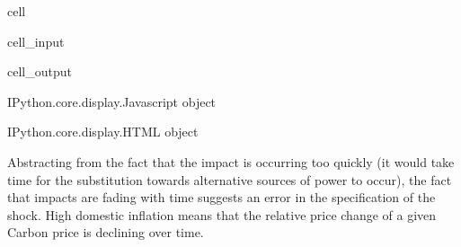 \documentclass[letterpaper,10pt,english]{jupyterBook}
\begin{document}
\begin{sphinxuseclass}{cell}\begin{sphinxVerbatimInput}

\begin{sphinxuseclass}{cell_input}
\begin{sphinxVerbatim}[commandchars=\\\{\}]

\PYG{p}{[}\PYG{p}{]}

    
\end{sphinxVerbatim}

\end{sphinxuseclass}\end{sphinxVerbatimInput}
\begin{sphinxVerbatimOutput}

\begin{sphinxuseclass}{cell_output}
\begin{sphinxVerbatim}[commandchars=\\\{\}]
\PYGZlt{}IPython.core.display.Javascript object\PYGZgt{}
\end{sphinxVerbatim}

\begin{sphinxVerbatim}[commandchars=\\\{\}]
\PYGZlt{}IPython.core.display.HTML object\PYGZgt{}
\end{sphinxVerbatim}

\end{sphinxuseclass}\end{sphinxVerbatimOutput}

\end{sphinxuseclass}
\sphinxAtStartPar
Abstracting from the fact that the impact is occurring too quickly (it would take time for the substitution towards alternative sources of power to occur), the fact that impacts are fading with time suggests an error in the specification of the shock.  High domestic inflation means that the relative price change of a given Carbon price is declining over time.
\end{document}
